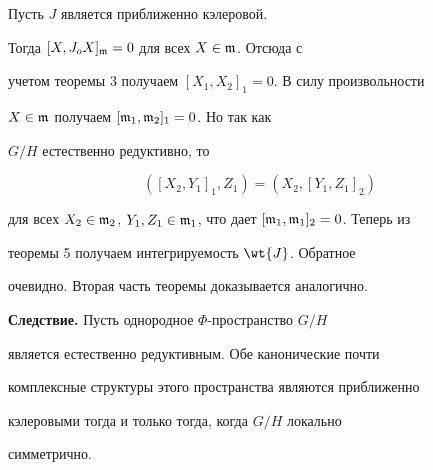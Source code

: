 \begin{pf}


Пусть $J$ является приближенно кэлеровой.


Тогда $[X,J_oX]_{\frak{m}}=0$ для всех $X \in \frak{m}$. Отсюда с


учетом теоремы 3 получаем $[X_1,X_2]_1=0$. В силу произвольности


$X \in \frak{m}$ получаем $[\frak{m}_1,\frak{m}_2]_1 =0$. Но так как


$G/H$ естественно редуктивно, то


$$


([X_2,Y_1]_1,Z_1)=(X_2,[Y_1,Z_1]_2)


$$


для всех $X_2 \in \frak{m}_2$, $Y_1,Z_1 \in


\frak{m}_1$, что дает $[\frak{m}_1,\frak{m}_1]_2=0$. Теперь из


теоремы 5 получаем интегрируемость $\wt{J}$. Обратное


очевидно. Вторая часть теоремы доказывается аналогично.


\end{pf}





{\bf Следствие.} Пусть однородное $\Phi$-пространство $G/H$


является естественно редуктивным. Обе канонические почти


комплексные структуры этого пространства являются приближенно


кэлеровыми тогда и только тогда, когда $G/H$ локально


симметрично.





